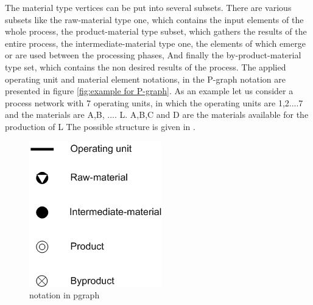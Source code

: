 The material type vertices can be put into several subsets. There are various subsets like the raw-material type one, which contains  the input elements of the whole process, the product-material type subset, which gathers the results of the entire process, the intermediate-material type one, the elements of which emerge or are used between the processing phases\cite{pns2}, And finally the by-product-material  type set, which contains the non desired results of the process. The applied operating unit and material element notations, in the P-graph notation are presented in figure \ref{fig:example for P-graph}. As an example let us consider a process network with 7 operating units, 
in which the operating units are 1,2....7 and the materials are A,B, .... L. A,B,C and D 
are the materials available for the production of L The possible structure is given in \cite{pns2, pns4}. 

\begin{figure}[th]
	\centering
		\includegraphics[scale=0.4]{ch2/img/notationP}
	\caption{\label{fig:notation in pgraph}notation in pgraph\cite{pns2}}
\end{figure}


